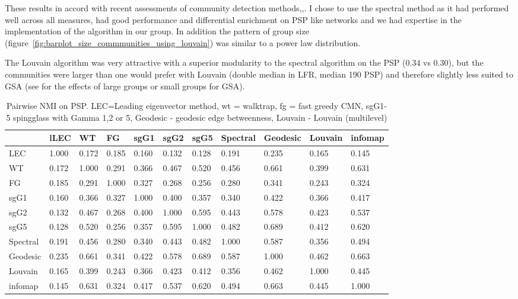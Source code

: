 These results in accord with recent assessments of community detection methods\cite{yang2016comparative},\cite{newman2018networks},\cite{fortunato2016community}. I chose to use the spectral method as it had performed well across all measures, had good performance and differential enrichment on PSP like networks\cite{mclean2016improved} and we had expertise in the implementation of the algorithm in our group. In addition the pattern of group size (figure~\ref{fig:barplot_size_commmunities_using_louvain}) was similar to a power law distribution.

The Louvain algorithm was very attractive with a superior modularity to the spectral algorithm on the PSP (0.34 vs 0.30), but the communities were larger than one would prefer with Louvain (double median in LFR, median 190 PSP) and therefore slightly less suited to GSA (see \cite{de2016statistical} for the effects of large groups or small groups for GSA).



\begin{table}[ht]
\centering
\begin{adjustbox}{width=\textwidth}

\setlength{\extrarowheight}{2pt}
\begin{tabular}{lllllllllll}
  \toprule
& lLEC & WT & FG & sgG1 & sgG2 & sgG5 & Spectral & Geodesic & Louvain & infomap \\ 
  \midrule
LEC & 1.000 & 0.172 & 0.185 & 0.160 & 0.132 & 0.128 & 0.191 & 0.235 & 0.165 & 0.145 \\ 
  WT & 0.172 & 1.000 & 0.291 & 0.366 & 0.467 & 0.520 & 0.456 & 0.661 & 0.399 & 0.631 \\ 
  FG & 0.185 & 0.291 & 1.000 & 0.327 & 0.268 & 0.256 & 0.280 & 0.341 & 0.243 & 0.324 \\ 
  sgG1 & 0.160 & 0.366 & 0.327 & 1.000 & 0.400 & 0.357 & 0.340 & 0.422 & 0.366 & 0.417 \\ 
  sgG2 & 0.132 & 0.467 & 0.268 & 0.400 & 1.000 & 0.595 & 0.443 & 0.578 & 0.423 & 0.537 \\ 
  sgG5 & 0.128 & 0.520 & 0.256 & 0.357 & 0.595 & 1.000 & 0.482 & 0.689 & 0.412 & 0.620 \\ 
  Spectral & 0.191 & 0.456 & 0.280 & 0.340 & 0.443 & 0.482 & 1.000 & 0.587 & 0.356 & 0.494 \\ 
  Geodesic & 0.235 & 0.661 & 0.341 & 0.422 & 0.578 & 0.689 & 0.587 & 1.000 & 0.462 & 0.663 \\ 
  Louvain & 0.165 & 0.399 & 0.243 & 0.366 & 0.423 & 0.412 & 0.356 & 0.462 & 1.000 & 0.445 \\ 
  infomap & 0.145 & 0.631 & 0.324 & 0.417 & 0.537 & 0.620 & 0.494 & 0.663 & 0.445 & 1.000 \\ 
   \bottomrule
\end{tabular}
\end{adjustbox}
\caption[Pairwise NMI for clustering algorithms on PSP]{Pairwise NMI on PSP. LEC=Leading eigenvector method, wt = walktrap, fg = fast greedy CMN, sgG1-5 spingglass with Gamma 1,2 or 5, Geodesic - geodesic edge betweenness, Louvain - Louvain (multilevel)} 
\label{tab:pairwise NMI on PSP}
\end{table}


